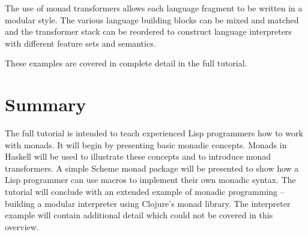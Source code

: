 \documentclass[natbib,10pt]{sigplanconf}
\begin{document}
The use of monad transformers allows each language fragment to be
written in a modular style.  The various language building blocks can
be mixed and matched and the transformer stack can be reordered to
construct language interpreters with different feature sets and
semantics.

These examples are covered in complete detail in the full tutorial.

\section{Summary}

The full tutorial is intended to teach experienced Lisp programmers
how to work with monads.  It will begin by presenting basic monadic
concepts.  Monads in Haskell will be used to illustrate these concepts
and to introduce monad transformers.  A simple Scheme monad package
will be presented to show how a Lisp programmer can use macros to
implement their own monadic syntax.  The tutorial will conclude with
an extended example of monadic programming -- building a modular
interpreter using Clojure's monad library.  The interpreter example
will contain additional detail which could not be covered in this
overview.







\end{document}
